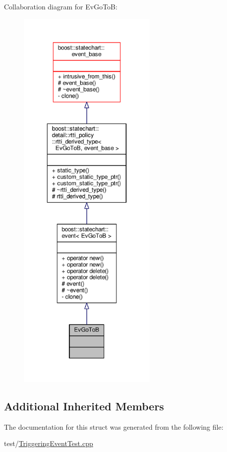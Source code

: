 Collaboration diagram for Ev\+Go\+ToB\+:
\nopagebreak
\begin{figure}[H]
\begin{center}
\leavevmode
\includegraphics[height=550pt]{struct_ev_go_to_b__coll__graph}
\end{center}
\end{figure}
\subsection*{Additional Inherited Members}


The documentation for this struct was generated from the following file\+:\begin{DoxyCompactItemize}
\item 
test/\mbox{\hyperlink{_triggering_event_test_8cpp}{Triggering\+Event\+Test.\+cpp}}\end{DoxyCompactItemize}
